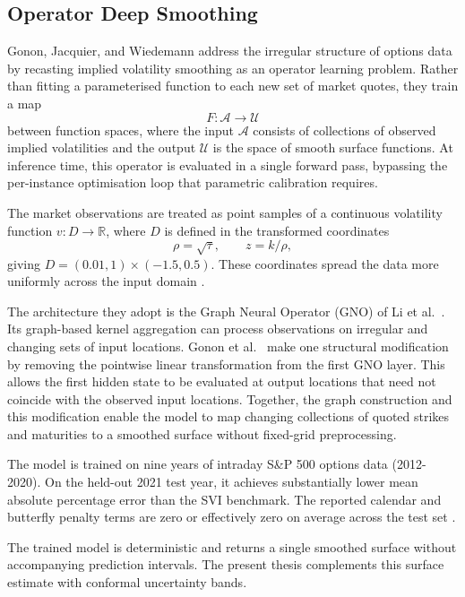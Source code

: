 \subsection{Operator Deep Smoothing}
\label{subsec:ops}

Gonon, Jacquier, and Wiedemann \cite{gonon2024operator} address the irregular structure of options data by recasting implied volatility smoothing as an operator learning problem. Rather than fitting a parameterised function to each new set of market quotes, they train a map
\[
F : \mathcal{A} \rightarrow \mathcal{U}
\]
between function spaces, where the input $\mathcal{A}$ consists of collections of observed implied volatilities and the output $\mathcal{U}$ is the space of smooth surface functions. At inference time, this operator is evaluated in a single forward pass, bypassing the per-instance optimisation loop that parametric calibration requires.

The market observations are treated as point samples of a continuous volatility function $v : D \to \mathbb{R}$, where $D$ is defined in the transformed coordinates
\[
\rho = \sqrt{\tau}, \qquad z = k/\rho,
\]
giving $D = (0.01, 1) \times (-1.5, 0.5)$. These coordinates spread the data more uniformly across the input domain \cite{gonon2024operator}.

The architecture they adopt is the Graph Neural Operator (GNO) of Li et al.\ \cite{li2020neural}. Its graph-based kernel aggregation can process observations on irregular and changing sets of input locations. Gonon et al.\ \cite{gonon2024operator} make one structural modification by removing the pointwise linear transformation from the first GNO layer. This allows the first hidden state to be evaluated at output locations that need not coincide with the observed input locations. Together, the graph construction and this modification enable the model to map changing collections of quoted strikes and maturities to a smoothed surface without fixed-grid preprocessing.

The model is trained on nine years of intraday S\&P 500 options data (2012-2020). On the held-out 2021 test year, it achieves substantially lower mean absolute percentage error than the SVI benchmark. The reported calendar and butterfly penalty terms are zero or effectively zero on average across the test set \cite{gonon2024operator}.

The trained model is deterministic and returns a single smoothed surface without accompanying prediction intervals. The present thesis complements this surface estimate with conformal uncertainty bands.

